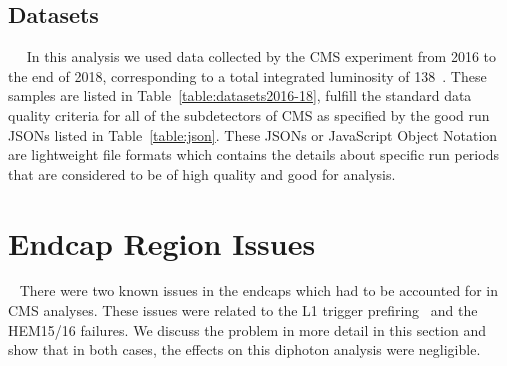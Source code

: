 

\subsection{Datasets}~\label{sec:CMSDataRunII}~\label{sec:datasets}
In this analysis we used data collected by the CMS experiment from 2016 to the end of 2018, corresponding to a total integrated luminosity of 138~\fbinv. These samples are listed in Table~\ref{table:datasets2016-18}, fulfill the standard data quality criteria for all of the subdetectors of CMS as specified by the good run JSONs listed in Table~\ref{table:json}. These JSONs or JavaScript Object Notation are lightweight file formats which contains the details about specific run periods that are considered to be of high quality and good for analysis.







\section{Endcap Region Issues}~\label{sec:EEIssues}
There were two known issues in the endcaps which had to be accounted for in CMS analyses. These issues were related to the L1 trigger prefiring~\cite{CMS:2020cmk, CMS_Collaboration_reweighting} and the HEM15/16 failures. We discuss the problem in more detail in this section and show that in both cases, the effects on this diphoton analysis were negligible. 

